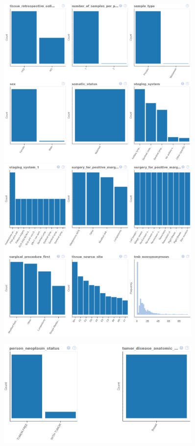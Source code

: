 \begin{figure}
	\includegraphics[width=0.9\textwidth]{NOTEBOOK/IMAGES_EDA/17}
	\includegraphics[width=0.9\textwidth]{NOTEBOOK/IMAGES_EDA/18}
\end{figure}

\begin{figure}
	\includegraphics[width=0.9\textwidth]{NOTEBOOK/IMAGES_EDA/19}
\end{figure}